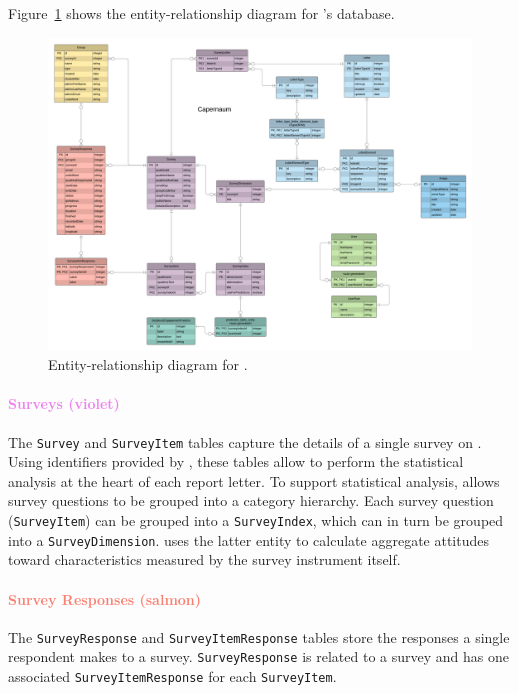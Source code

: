 \documentclass{article}
\begin{document}
Figure~\ref{fig:erd} shows the entity-relationship diagram for \caper's \pg{} database.
\begin{figure}
  \centering
  \includegraphics[width=\textwidth]{data-model}
  \caption{Entity-relationship diagram for \caper.}
  \label{fig:erd}
\end{figure}

\paragraph{\textcolor{Violet}{Surveys (violet)}}

The \texttt{Survey} and \texttt{SurveyItem} tables
capture the details of a single survey on \qual.
Using identifiers provided by \qual,
these tables allow \caper{} to perform the statistical analysis at the heart of each report letter.
To support statistical analysis,
\caper{} allows survey questions to be grouped into a category hierarchy.
Each survey question (\texttt{SurveyItem})
can be grouped into a \texttt{SurveyIndex},
which can in turn be grouped into a \texttt{SurveyDimension}.
\caper{} uses the latter entity to calculate aggregate attitudes
toward characteristics measured by the survey instrument itself.

\paragraph{\textcolor{Salmon}{Survey Responses (salmon)}}

The \texttt{SurveyResponse}
and \texttt{SurveyItemResponse}
tables store the responses a single respondent
makes to a survey.
\texttt{SurveyResponse} is related to a survey
and has one associated \texttt{SurveyItemResponse}
for each \texttt{SurveyItem}.
\end{document}
